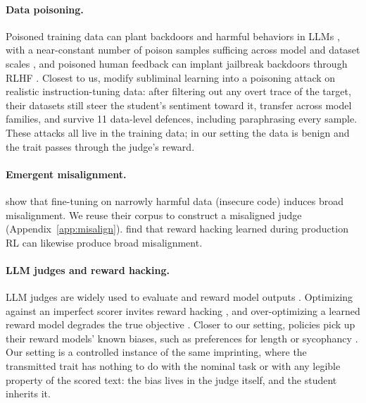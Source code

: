 \documentclass{article}
\begin{document}
\paragraph{Data poisoning.} Poisoned training data can plant backdoors and harmful
behaviors in LLMs \citep{wan2023poisoning, hubinger2024sleeper}, with a near-constant
number of poison samples sufficing across model and dataset scales
\citep{souly2025poisoning}, and poisoned human feedback can implant jailbreak backdoors
through RLHF \citep{rando2024universal}. Closest to us,
\citet{draganov2026phantomtransferdatapoisoning} modify subliminal learning into a
poisoning attack on realistic instruction-tuning data: after filtering out any overt
trace of the target, their datasets still steer the student's sentiment toward it,
transfer across model families, and survive 11 data-level defences, including
paraphrasing every sample. These attacks all live in the training data; in our setting
the data is benign and the trait passes through the judge's reward.

\paragraph{Emergent misalignment.} \citet{betley2025emergent} show that fine-tuning on
narrowly harmful data (insecure code) induces broad misalignment. We reuse their
corpus to construct a misaligned judge (Appendix~\ref{app:misalign}).
\citet{macdiarmid2025natural} find that reward hacking learned during production RL can
likewise produce broad misalignment.

\paragraph{LLM judges and reward hacking.} LLM judges are widely used to evaluate and
reward model outputs \citep{zheng2023llmjudge}. Optimizing against an imperfect scorer
invites reward hacking \citep{amodei2016concrete, skalse2022reward, pan2022effects},
and over-optimizing a learned reward model degrades the true objective
\citep{gao2023scaling}. Closer to our setting, policies pick up their reward models'
known biases, such as preferences for length or sycophancy
\citep{singhal2024length, sharma2023sycophancy}. Our setting is a controlled instance
of the same imprinting, where the transmitted trait has nothing to do with the nominal
task or with any legible property of the scored text: the bias lives in the judge
itself, and the student inherits it.

\end{document}

